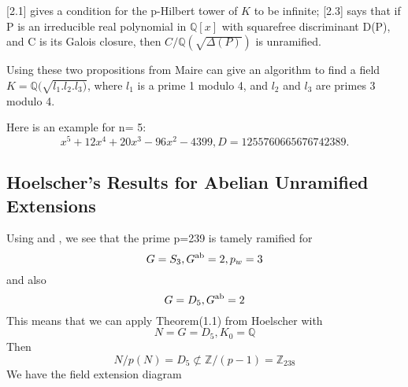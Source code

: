 \documentclass[12pt]{extarticle}
\newcommand{\<}{\langle}
\renewcommand{\>}{\rangle}
\theoremstyle{definition}
\begin{document}
\cite{MAIR}[2.1] gives a condition for the p-Hilbert tower of $K$ to be infinite; \cite{MAIR}[2.3] says that if P is an irreducible real polynomial in $\mathbb{Q}[x]$ with squarefree discriminant D(P), and C is its Galois closure, then $C/\mathbb{Q}(\sqrt{\Delta(P)})$ is unramified.
\par
Using these two propositions from Maire can give an algorithm to find a field $K=\mathbb{Q}(\sqrt{l_1.l_2.l_3)}$, where $l_1$ is a prime 1 modulo 4, and $l_2$ and $l_3$ are primes 3 modulo 4. 
\par
Here is an example for n= 5:
\begin{equation}
    x^5 + 12x^4 + 20x^3 - 96x^2 - 4399, D=1255760665676742389.
\end{equation}


\subsection{Hoelscher's Results for Abelian Unramified Extensions}
Using \cite{HOEL} and \cite{JONE}, we see that 
the prime p=239 is tamely ramified for 
\begin{equation}
  G=S_3,G\textsuperscript{ab} = 2, p_w =3  
\end{equation} and also 
\begin{equation}
    G=D_5,G\textsuperscript{ab} = 2 
\end{equation}
This means that we can apply Theorem(1.1) from Hoelscher with
\begin{equation}
    N = G = D_5, K_0 = \mathbb{Q}
\end{equation}
Then 
\begin{equation}
N/p(N) = D_5 \not\subset \mathbb{Z}/(p-1) = \mathbb{Z}_{238}
\end{equation}
We have the field extension diagram
\begin{center}
    
\end{center}
\end{document}
